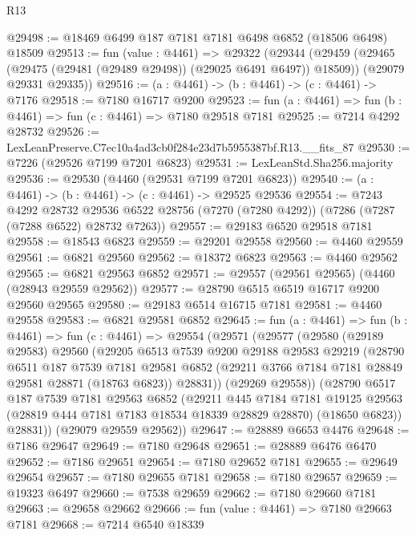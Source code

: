 \begin{lexlean}{R13}
\begin{coremodule}
@29498 := @18469 @6499 @187 @7181 @7181 @6498 @6852 (@18506 @6498) @18509
@29513 := fun (value : @4461) =>
  @29322
    (@29344
      (@29459 (@29465 (@29475 (@29481 (@29489 @29498)) (@29025 @6491 @6497)) @18509))
      (@29079 @29331 @29335))
@29516 := (a : @4461) -> (b : @4461) -> (c : @4461) -> @7176
@29518 := @7180 @16717 @9200
@29523 := fun (a : @4461) => fun (b : @4461) => fun (c : @4461) => @7180 @29518 @7181
@29525 := @7214 @4292 @28732
@29526 := LexLeanPreserve.C7ec10a4ad3cb0f284e23d7b5955387bf.R13.__fits_87
@29530 := @7226 (@29526 @7199 @7201 @6823)
@29531 := LexLeanStd.Sha256.majority
@29536 := @29530 (@4460 (@29531 @7199 @7201 @6823))
@29540 := (a : @4461) -> (b : @4461) -> (c : @4461) -> @29525 @29536
@29554 := @7243
    @4292
    @28732
    @29536
    @6522
    @28756
    (@7270 (@7280 @4292))
    (@7286 (@7287 (@7288 @6522) @28732 @7263))
@29557 := @29183 @6520 @29518 @7181
@29558 := @18543 @6823
@29559 := @29201 @29558
@29560 := @4460 @29559
@29561 := @6821 @29560
@29562 := @18372 @6823
@29563 := @4460 @29562
@29565 := @6821 @29563 @6852
@29571 := @29557 (@29561 @29565) (@4460 (@28943 @29559 @29562))
@29577 := @28790 @6515 @6519 @16717 @9200 @29560 @29565
@29580 := @29183 @6514 @16715 @7181
@29581 := @4460 @29558
@29583 := @6821 @29581 @6852
@29645 := fun (a : @4461) =>
  fun (b : @4461) =>
  fun (c : @4461) =>
  @29554
    (@29571
      (@29577
        (@29580
          (@29189 @29583)
          @29560
          (@29205
            @6513
            @7539
            @9200
            @29188
            @29583
            @29219
            (@28790
              @6511
              @187
              @7539
              @7181
              @29581
              @6852
              (@29211 @3766 @7184 @7181 @28849 @29581 @28871 (@18763 @6823))
              @28831))
          (@29269 @29558))
        (@28790
          @6517
          @187
          @7539
          @7181
          @29563
          @6852
          (@29211
            @445
            @7184
            @7181
            @19125
            @29563
            (@28819 @444 @7181 @7183 @18534 @18339 @28829 @28870)
            (@18650 @6823))
          @28831))
      (@29079 @29559 @29562))
@29647 := @28889 @6653 @4476
@29648 := @7186 @29647
@29649 := @7180 @29648
@29651 := @28889 @6476 @6470
@29652 := @7186 @29651
@29654 := @7180 @29652 @7181
@29655 := @29649 @29654
@29657 := @7180 @29655 @7181
@29658 := @7180 @29657
@29659 := @19323 @6497
@29660 := @7538 @29659
@29662 := @7180 @29660 @7181
@29663 := @29658 @29662
@29666 := fun (value : @4461) => @7180 @29663 @7181
@29668 := @7214 @6540 @18339

\end{coremodule}
\end{lexlean}
